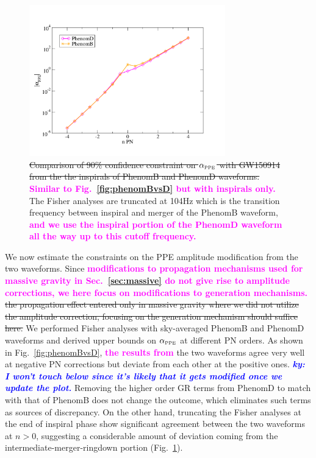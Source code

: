 \documentclass[prd,twocolumn,nofootinbib]{revtex4-1}
\newcommand{\PPE}{{\mbox{\tiny PPE}}}
\newcommand{\ky}[1]{\textcolor{blue}{\it{\textbf{ky: #1}}} }
\newcommand{\kent}[1]{\textcolor{magenta}{\textbf{#1}} }
\begin{document}
\begin{figure}[htb]
\includegraphics[width=8.5cm]{phenomBvsphenomD-insp.pdf}
\caption{\sout{Comparison of 90\% confidence constraint on $\alpha_{\PPE}$ with GW150914 from the the inspirals of PhenomB and PhenomD waveforms.} \kent{Similar to Fig.~\ref{fig:phenomBvsD} but with inspirals only.} The Fisher analyses are truncated at 104Hz which is the transition frequency between inspiral and merger of the PhenomB waveform, \kent{and we use the inspiral portion of the PhenomD waveform all the way up to this cutoff frequency.}}
\label{fig:phenomBvsD-insp}
\end{figure}

We now estimate the constraints on the PPE amplitude modification from the two waveforms. Since \kent{modifications to propagation mechanisms used for massive gravity in Sec.~\ref{sec:massive} do not give rise to amplitude corrections, we here focus on modifications to generation mechanisms.}
\sout{the propagation effect entered only in massive gravity where we did not utilize the amplitude correction, focusing on the generation mechanism should suffice here.} We performed Fisher analyses with sky-averaged PhenomB and PhenomD waveforms and derived upper bounds on $\alpha_{\PPE}$ at different PN orders. As shown in Fig.~\ref{fig:phenomBvsD}, \kent{the results from} the two waveforms agree very well at negative PN corrections but deviate from each other at the positive ones. \ky{I won't touch below since it's likely that it gets modified once we update the plot.}
Removing the higher order GR terms from PhenomD to match with that of PhenomB does not change the outcome, which eliminates such terms as sources of discrepancy. On the other hand, truncating the Fisher analyses at the end of inspiral phase show significant agreement between the two waveforms at $n>0$, suggesting a considerable amount of deviation coming from the intermediate-merger-ringdown portion (Fig.~\ref{fig:phenomBvsD-insp}).
\end{document}
